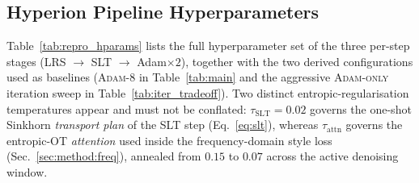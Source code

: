 \subsection{Hyperion Pipeline Hyperparameters}
\label{app:repro:hparams}
Table~\ref{tab:repro_hparams} lists the full hyperparameter set of the three
per-step stages (LRS $\to$ SLT $\to$ Adam$\times2$), together with the two
derived configurations used as baselines (\textsc{Adam-8} in
Table~\ref{tab:main} and the aggressive \textsc{Adam-only} iteration sweep in
Table~\ref{tab:iter_tradeoff}). Two distinct entropic-regularisation
temperatures appear and must not be conflated: $\tau_{\mathrm{SLT}}=0.02$ governs
the one-shot Sinkhorn \emph{transport plan} of the SLT step (Eq.~\ref{eq:slt}),
whereas $\tau_{\mathrm{attn}}$ governs the entropic-OT \emph{attention} used
inside the frequency-domain style loss (Sec.~\ref{sec:method:freq}), annealed
from $0.15$ to $0.07$ across the active denoising window.

